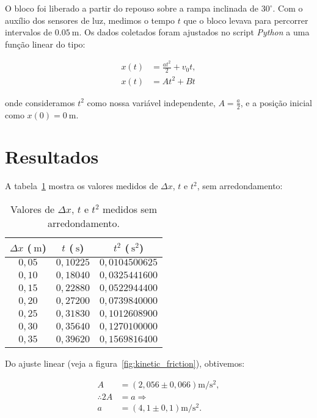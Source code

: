 \documentclass[10pt,twoside,twocolumn]{article} %
\begin{document}
O bloco foi liberado a partir do repouso sobre a rampa inclinada de $30^\circ$.
Com o auxílio dos sensores de luz, medimos o tempo $t$ que o bloco levava para
percorrer intervalos de $\SI{0,05}{\metre}$. Os dados coletados foram ajustados
no script \textit{Python} a uma função linear do tipo:

\begin{align}
	x(t) &= \frac{at^2}{2} + v_0t, \nonumber \\
	x(t) &= At^2 + Bt
\end{align}

onde consideramos $t^2$ como nossa variável independente, $A = \frac{a}{2}$, e
a posição inicial como $x(0) = \SI{0}{\meter}$.

\section{Resultados}

A tabela~\ref{tbl:dados} mostra os valores medidos de $\Delta x$, $t$ e
$t^2$, sem arredondamento:

\begin{table}[ht!]
	\centering
		\begin{tabular}{|| c | c | c ||}
		\hline
		$\Delta x$ ($\SI{}{\metre}$) & $t$ ($\SI{}{\second}$) & $t^2$ ($\SI{}{\second^2}$) \\
		\hline\hline
		$0,05$ & $0,10225$ & $0,0104500625$ \\
		$0,10$ & $0,18040$ & $0,0325441600$ \\
		$0,15$ & $0,22880$ & $0,0522944400$ \\
		$0,20$ & $0,27200$ & $0,0739840000$ \\
		$0,25$ & $0,31830$ & $0,1012608900$ \\
		$0,30$ & $0,35640$ & $0,1270100000$ \\
		$0,35$ & $0,39620$ & $0,1569816400$ \\
		\hline
	\end{tabular}
	\caption{Valores de $\Delta x$, $t$ e $t^2$ medidos sem arredondamento.}
	\label{tbl:dados}
\end{table}

Do ajuste linear (veja a figura~\ref{fig:kinetic_friction}), obtivemos:

\begin{align}\label{eq:accel}
	A &= \left( 2,056 \pm 0,066 \right) \si{\metre\per\second\squared}, \nonumber \\
	\therefore 2A &= a \Rightarrow \nonumber \\
	a &= \left( 4,1 \pm 0,1 \right) \si{\metre\per\second\squared}.
\end{align}
\end{document}
